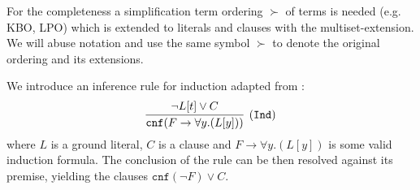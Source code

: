 For the completeness a simplification term ordering $\succ$ of terms is needed (e.g. KBO, LPO) which is extended to literals and clauses with the multiset-extension. We will abuse notation and use the same symbol $\succ$ to denote the original ordering and its extensions.

We introduce an inference rule for induction adapted from \cite{vampireinduction}:
\begin{equation*}\label{eq:ind:rule}
\infer[\small{\tt (Ind)}]{\mathtt{cnf}(F \rightarrow \forall y.(L[y]))}{\lnot L[t] \lor C}
\end{equation*}
where $L$ is a ground literal, $C$ is a clause and $F \rightarrow \forall y.(L[y])$ is some valid induction formula. The conclusion of the rule can be then resolved against its
premise, yielding the clauses $\mathtt{cnf}(\lnot F) \lor C$.